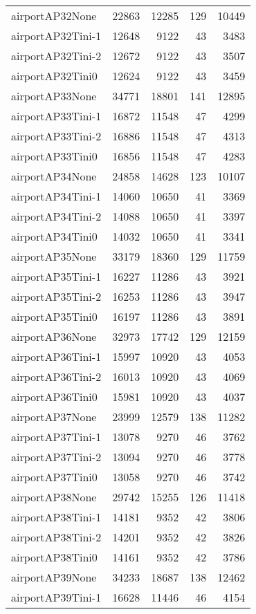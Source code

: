 \begin{longtable}{lrrrr}
airportAP32None & 22863 & 12285 & 129 & 10449 \\
airportAP32Tini-1 & 12648 & 9122 & 43 & 3483 \\
airportAP32Tini-2 & 12672 & 9122 & 43 & 3507 \\
airportAP32Tini0 & 12624 & 9122 & 43 & 3459 \\
airportAP33None & 34771 & 18801 & 141 & 12895 \\
airportAP33Tini-1 & 16872 & 11548 & 47 & 4299 \\
airportAP33Tini-2 & 16886 & 11548 & 47 & 4313 \\
airportAP33Tini0 & 16856 & 11548 & 47 & 4283 \\
airportAP34None & 24858 & 14628 & 123 & 10107 \\
airportAP34Tini-1 & 14060 & 10650 & 41 & 3369 \\
airportAP34Tini-2 & 14088 & 10650 & 41 & 3397 \\
airportAP34Tini0 & 14032 & 10650 & 41 & 3341 \\
airportAP35None & 33179 & 18360 & 129 & 11759 \\
airportAP35Tini-1 & 16227 & 11286 & 43 & 3921 \\
airportAP35Tini-2 & 16253 & 11286 & 43 & 3947 \\
airportAP35Tini0 & 16197 & 11286 & 43 & 3891 \\
airportAP36None & 32973 & 17742 & 129 & 12159 \\
airportAP36Tini-1 & 15997 & 10920 & 43 & 4053 \\
airportAP36Tini-2 & 16013 & 10920 & 43 & 4069 \\
airportAP36Tini0 & 15981 & 10920 & 43 & 4037 \\
airportAP37None & 23999 & 12579 & 138 & 11282 \\
airportAP37Tini-1 & 13078 & 9270 & 46 & 3762 \\
airportAP37Tini-2 & 13094 & 9270 & 46 & 3778 \\
airportAP37Tini0 & 13058 & 9270 & 46 & 3742 \\
airportAP38None & 29742 & 15255 & 126 & 11418 \\
airportAP38Tini-1 & 14181 & 9352 & 42 & 3806 \\
airportAP38Tini-2 & 14201 & 9352 & 42 & 3826 \\
airportAP38Tini0 & 14161 & 9352 & 42 & 3786 \\
airportAP39None & 34233 & 18687 & 138 & 12462 \\
airportAP39Tini-1 & 16628 & 11446 & 46 & 4154 \\

\end{longtable}

